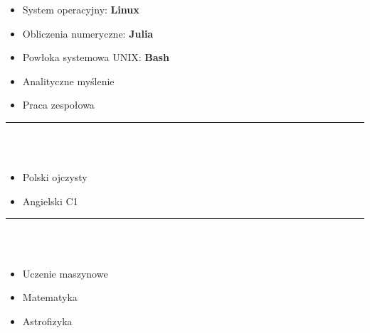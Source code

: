 \documentclass[10pt]{article}
\begin{document}
\begin{minipage}[t]{0.30\textwidth}
\begin{itemize}[leftmargin=*]
            \item System operacyjny: \textbf{Linux}
            \item Obliczenia numeryczne: \textbf{Julia}
            \item Powłoka systemowa UNIX: \textbf{Bash} 
            \item Analityczne myślenie
            \item Praca zespołowa 
        \end{itemize}
        \rule{6cm}{1pt} \\ \\
        \fontsize{10pt}{10pt}
        \begin{itemize}[leftmargin=*]
            \setlength{\parskip}{0pt}
            \item Polski ojczysty
            \item Angielski C1
        \end{itemize}
        \rule{6cm}{1pt} \\ \\
        \fontsize{10pt}{10pt}
        \begin{itemize}[leftmargin=*]
            \setlength{\parskip}{0pt}
            \item Uczenie maszynowe
            \item Matematyka
            \item Astrofizyka
        \end{itemize}
    \end{minipage}
    \hfill %
\end{document}

